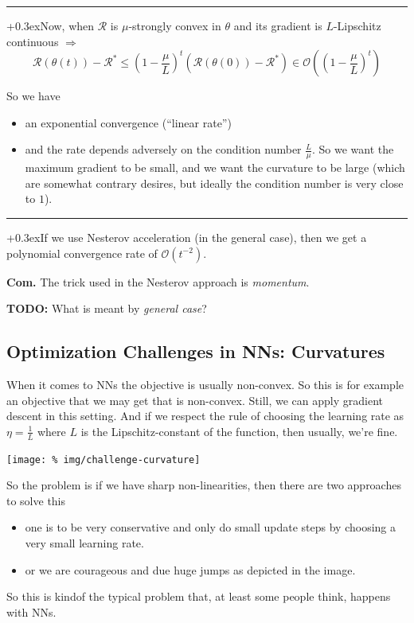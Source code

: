 \documentclass[a2paper,8pt]{extarticle}
\newcommand{\BigO}{\mathcal{O}}
\newcommand{\cR}{\mathcal{R}}
\newcommand{\todo}[1]{\textbf{TODO:} #1}
\newcommand{\todo}[1]{%
}
\newcommand{\customboxpaddingsize}{0pt}
\newcommand{\emptyarg}[1][]{\ifthenelse{\isempty{#1}}{}{\ (#1)}}
\newcommand{\Thm}[1][]{{\setlength\fboxsep{\customboxpaddingsize}
\colorbox{thmcolor}{%
\color{custtitlecolor}{\textbf{T.\emptyarg[#1]}}}\kern+0.3ex}}
\newcommand{\Com}{\textbf{Com.} }
\newcommand{\sep}{\vspace{0pt}\noindent\hrule\vspace{0pt}}
\newcommand{\sep}{\vspace{5pt}\noindent\hrule\vspace{5pt}}
\begin{document}
\begin{landscape}
\begin{multicols*}{7}
\sep

\Thm Now, when $\cR$ is $\mu$-strongly convex in $\theta$ and its gradient is
$L$-Lipschitz continuous $\Longrightarrow$
\[
\cR(\theta(t))
-
\cR^*
\leq
\left(1-\frac{\mu}{L}\right)^t
(\cR(\theta(0))-\cR^*)
\in
\BigO\left(\left(1-\frac{\mu}{L}\right)^t\right)
\]

So we have
\begin{itemize}
  \item an exponential convergence (``linear rate'')
  \item and the rate depends adversely on the condition number $\frac{L}{\mu}$.
  So we want the maximum gradient to be small, and we want the curvature to be
  large (which are somewhat contrary desires, but ideally the condition number
  is very close to $1$).
\end{itemize}

\sep

\Thm If we use Nesterov acceleration (in the general case), then we get a
polynomial convergence rate of $\BigO(t^{-2})$.

\Com The trick used in the Nesterov approach is \emph{momentum}.

\todo{What is meant by \emph{general case}?}

\subsection{Optimization Challenges in NNs: Curvatures}

When it comes to NNs the objective is usually non-convex. So this is for example
an objective that we may get that is non-convex. Still, we can apply gradient
descent in this setting. And if we respect the rule of choosing the learning
rate as $\eta=\frac{1}{L}$ where $L$ is the Lipschitz-constant of the function,
then usually, we're fine.

\begin{center}
  \texttt{[image: \%
img/challenge-curvature]}
\end{center}

So the problem is if we have sharp non-linearities, then there are two
approaches to solve this
\begin{itemize}
  \item one is to be very conservative and only do small update steps by
  choosing a very small learning rate.
  \item or we are courageous and due huge jumps as depicted in the image.
\end{itemize}
So this is kindof the typical problem that, at least some people think, happens
with NNs.


\end{multicols*}
\end{landscape}
\end{document}
